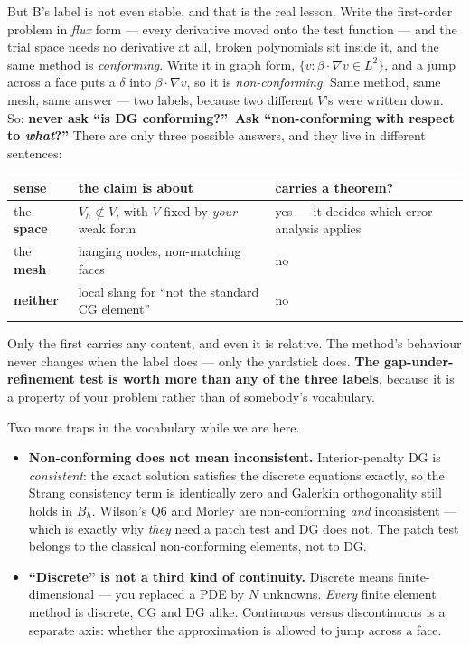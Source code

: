 \documentclass[11pt]{article}
\begin{document}
\medskip
\noindent
But B's label is not even stable, and that is the real lesson. Write the
first-order problem in \emph{flux} form --- every derivative moved onto the
test function --- and the trial space needs no derivative at all, broken
polynomials sit inside it, and the same method is \emph{conforming}. Write it
in graph form, $\{v:\beta\!\cdot\!\nabla v\in L^{2}\}$, and a jump across a
face puts a $\delta$ into $\beta\!\cdot\!\nabla v$, so it is
\emph{non-conforming}. Same method, same mesh, same answer --- two labels,
because two different $V$'s were written down. So: \textbf{never ask ``is DG
conforming?''\ Ask ``non-conforming with respect to \emph{what}?''} There are
only three possible answers, and they live in different sentences:

\begin{center}\small
\renewcommand{\arraystretch}{1.3}
\begin{tabular}{@{}lll@{}}
\toprule
sense & the claim is about & carries a theorem?\\
\midrule
the \textbf{space} & $V_{h}\not\subset V$, with $V$ fixed by \emph{your} weak form
                   & yes --- it decides which error analysis applies\\
the \textbf{mesh}  & hanging nodes, non-matching faces & no\\
\textbf{neither}   & local slang for ``not the standard CG element'' & no\\
\bottomrule
\end{tabular}
\end{center}

\noindent
Only the first carries any content, and even it is relative. The method's
behaviour never changes when the label does --- only the yardstick does.
\textbf{The gap-under-refinement test is worth more than any of the three
labels}, because it is a property of your problem rather than of somebody's
vocabulary.

\medskip
\noindent
Two more traps in the vocabulary while we are here.
\begin{itemize}[leftmargin=1.4em, topsep=3pt, itemsep=3pt]
\item \textbf{Non-conforming does not mean inconsistent.} Interior-penalty DG
      is \emph{consistent}: the exact solution satisfies the discrete
      equations exactly, so the Strang consistency term is identically zero
      and Galerkin orthogonality still holds in $B_{h}$. Wilson's Q6 and
      Morley are non-conforming \emph{and} inconsistent --- which is exactly
      why \emph{they} need a patch test and DG does not. The patch test
      belongs to the classical non-conforming elements, not to DG.
\item \textbf{``Discrete'' is not a third kind of continuity.} Discrete means
      finite-dimensional --- you replaced a PDE by $N$ unknowns. \emph{Every}
      finite element method is discrete, CG and DG alike. Continuous versus
      discontinuous is a separate axis: whether the approximation is allowed
      to jump across a face.
\end{itemize}
\end{document}
